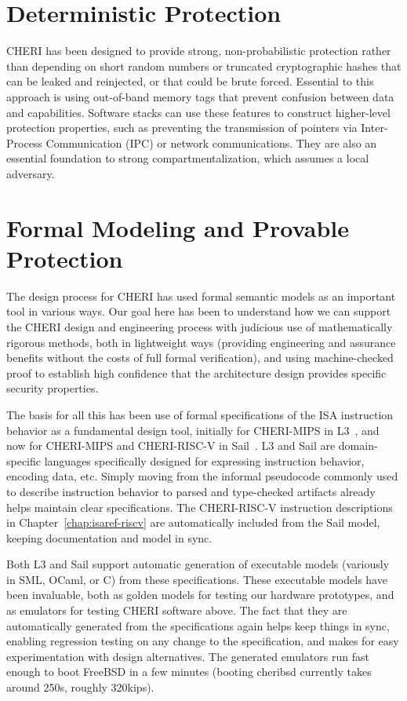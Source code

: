 \section{Deterministic Protection}

CHERI has been designed to provide strong, non-probabilistic protection rather
than depending on short random numbers or truncated cryptographic hashes that
can be leaked and reinjected, or that could be brute forced.
Essential to this approach is using out-of-band memory tags that prevent
confusion between data and capabilities.
Software stacks can use these features to construct higher-level protection
properties, such as preventing the transmission of pointers via Inter-Process
Communication (IPC) or network communications.
They are also an essential foundation to strong compartmentalization, which
assumes a local adversary.

\section{Formal Modeling and Provable Protection}

The design process for CHERI has used formal semantic models as an
important tool  in
various ways.
%
Our
goal here has been to understand how we can support the CHERI design
and engineering process with judicious use of mathematically rigorous
methods, both in lightweight ways (providing engineering and assurance
benefits without the costs of full formal verification), and using
machine-checked proof to establish high confidence that the
architecture design provides specific security properties.

The basis for all this has been use of formal specifications of the
ISA instruction behavior as a fundamental design tool, initially for
CHERI-MIPS in L3~\cite{Fox2015}, and now for CHERI-MIPS and
CHERI-RISC-V in Sail~\cite{sail-popl2019}.  L3 and Sail are
domain-specific languages specifically designed for expressing
instruction behavior, encoding data, etc.
Simply moving from the informal pseudocode commonly used to describe
instruction behavior to parsed and type-checked
artifacts already helps maintain clear specifications.
The CHERI-RISC-V instruction descriptions in Chapter~\ref{chap:isaref-riscv}
are automatically included from the Sail model, keeping documentation
and model in sync.

Both L3 and Sail support automatic generation of executable models
(variously in SML, OCaml, or C) from these specifications.  These
executable models have been invaluable, both as golden models for
testing our hardware prototypes, and as emulators for testing CHERI
software above.  The fact that they are automatically generated from
the specifications again helps keep things in sync, enabling
regression testing on any change to the specification, and makes for
easy experimentation with design alternatives.
The generated emulators run fast enough to boot FreeBSD in a few minutes (booting
cheribsd
currently takes around 250s, roughly 320kips).

